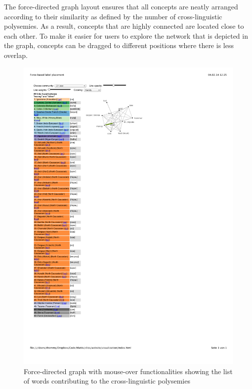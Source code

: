 The force-directed graph layout ensures that all concepts are neatly arranged according to their similarity as defined by the number of cross-linguistic polysemies. As a result, concepts that are highly connected are located close to each other.  To make it easier for users to explore the network that is depicted in the graph, concepts can be dragged to different positions where there is less overlap.

\begin{figure}[htbp]
\begin{center}
\includegraphics[width=\textwidth]{img/moneysilver.pdf}
\caption{Force-directed graph with mouse-over functionalities showing the list of words contributing to the cross-linguistic polysemies}
\label{MoneySilver}
\end{center}
\end{figure}

